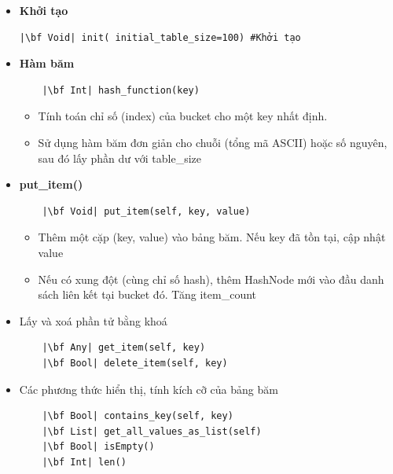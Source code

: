 \begin{itemize}
    \item \textbf{Khởi tạo}
\begin{verbatim}
|\bf Void| init( initial_table_size=100) #Khởi tạo
\end{verbatim}
\item \textbf{Hàm băm}
\begin{verbatim}
    |\bf Int| hash_function(key)
\end{verbatim}
\begin{itemize}
    \item Tính toán chỉ số (index) của bucket cho một key nhất định. 
    \item Sử dụng hàm băm đơn giản cho chuỗi (tổng mã ASCII) hoặc số nguyên, sau đó lấy phần dư với table\_size
\end{itemize}
\item \textbf{put\_item()}
\begin{verbatim}
    |\bf Void| put_item(self, key, value)
\end{verbatim}
\begin{itemize}
    \item  Thêm một cặp (key, value) vào bảng băm. Nếu key đã tồn tại, cập nhật value
    \item Nếu có xung đột (cùng chỉ số hash), thêm HashNode mới vào đầu danh sách liên kết tại bucket đó. Tăng item\_count
\end{itemize}
\item Lấy và xoá phần tử bằng khoá
\begin{verbatim}
    |\bf Any| get_item(self, key)
    |\bf Bool| delete_item(self, key)
\end{verbatim}
\item Các phương thức hiển thị, tính kích cỡ của bảng băm
\begin{verbatim}
    |\bf Bool| contains_key(self, key)
    |\bf List| get_all_values_as_list(self)
    |\bf Bool| isEmpty()
    |\bf Int| len()
\end{verbatim}
\end{itemize}
